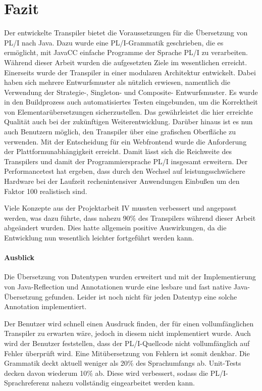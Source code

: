 \section{Fazit}
Der entwickelte Transpiler bietet die Voraussetzungen für die Übersetzung von PL/I nach Java. Dazu wurde eine PL/I-Grammatik geschrieben, die es ermöglicht, mit JavaCC einfache Programme der Sprache PL/I zu verarbeiten. Während dieser Arbeit wurden die aufgesetzten Ziele im wesentlichen erreicht. 
Einerseits wurde der Transpiler in einer modularen Architektur entwickelt. Dabei haben sich mehrere Entwurfsmuster als nützlich erwiesen,
namentlich die Verwendung der Strategie-, Singleton- und Composite- Entwurfsmuster.
Es wurde in den Buildprozess auch automatisiertes Testen eingebunden, um die Korrektheit von Elementarübersetzungen sicherzustellen. Das gewährleistet die hier erreichte Qualität auch bei der zukünftigen Weiterentwicklung.
Darüber hinaus ist es nun auch Benutzern möglich, den Transpiler über eine grafischen Oberfläche zu verwenden.
Mit der Entscheidung für ein Webfrontend wurde die Anforderung der Plattformunabhängigkeit erreicht. Damit lässt sich die Reichweite des Transpilers und damit der Programmiersprache PL/I insgesamt erweitern.
Der Performancetest hat ergeben, dass durch den Wechsel auf leistungsschwächere Hardware bei der Laufzeit rechenintensiver Anwendungen Einbußen um den Faktor 100 realistisch sind.

Viele Konzepte aus der Projektarbeit IV mussten verbessert und angepasst werden, was dazu führte, dass nahezu 90\% des Transpilers
während dieser Arbeit abgeändert wurden. Dies hatte allgemein positive Auswirkungen, da die Entwicklung nun wesentlich leichter fortgeführt werden kann.

\paragraph*{Ausblick} Die Übersetzung von Datentypen wurden erweitert und mit der Implementierung von Java-Reflection und Annotationen wurde eine lesbare und fast native Java-Übersetzung gefunden. Leider ist noch nicht für jeden Datentyp eine solche Annotation implementiert. 

Der Benutzer wird schnell einen Ausdruck finden, der für einen vollumfänglichen Transpiler zu erwarten wäre, jedoch in diesem nicht implementiert wurde.
Auch wird der Benutzer feststellen, dass der PL/I-Quellcode nicht vollumfänglich auf Fehler überprüft wird. Eine Mitübersetzung von Fehlern ist somit denkbar.
Die Grammatik deckt aktuell weniger als 20\% des Sprachumfangs ab. Unit-Tests decken davon wiederum 10\% ab.
Diese wird verbessert, sodass die PL/I-Sprachreferenz nahezu vollständig eingearbeitet werden kann.

